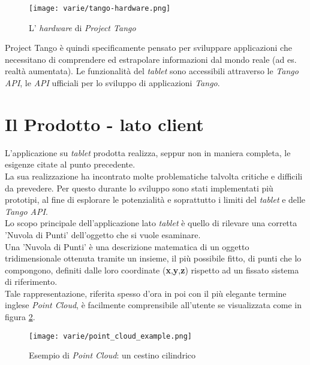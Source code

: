 \begin{figure}[!h] 
    \centering 
    \texttt{[image: varie/tango-hardware.png]} 
    \caption{L' \emph{hardware} di \emph{Project Tango}}
    \label{fig:tango_hardware}
\end{figure}

\noindent
Project Tango è quindi specificamente pensato per sviluppare applicazioni che necessitano di comprendere ed estrapolare informazioni dal mondo reale (ad es. realtà aumentata).
Le funzionalità del \emph{tablet} sono accessibili attraverso le \emph{Tango API}, le \emph{API} ufficiali per lo sviluppo di applicazioni \emph{Tango}.


\section{Il Prodotto - lato client}

L'applicazione su \emph{tablet} prodotta realizza, seppur non in maniera completa, le esigenze citate al punto precedente. \\
La sua realizzazione ha incontrato molte problematiche talvolta critiche e difficili da prevedere. Per questo durante lo sviluppo sono stati implementati più prototipi, al fine di esplorare le potenzialità e soprattutto i limiti del \emph{tablet} e delle \emph{Tango API}. \\
Lo scopo principale dell'applicazione lato \emph{tablet} è quello di rilevare una corretta 'Nuvola di Punti' dell'oggetto che si vuole esaminare.\\
Una 'Nuvola di Punti' è una descrizione matematica di un oggetto tridimensionale ottenuta tramite un insieme, il più possibile fitto, di punti che lo compongono, definiti dalle loro coordinate (\textbf{x},\textbf{y},\textbf{z}) rispetto ad un fissato sistema di riferimento. \\
Tale rappresentazione, riferita spesso d'ora in poi con il più elegante termine inglese \emph{Point Cloud}, è facilmente comprensibile all'utente se visualizzata come in figura \ref{fig:point_cloud_example}.
\begin{figure}[!h] 
    \centering 
    \texttt{[image: varie/point\_cloud\_example.png]} 
    \caption{Esempio di \emph{Point Cloud}: un cestino cilindrico}
   \label{fig:point_cloud_example}
\end{figure}

